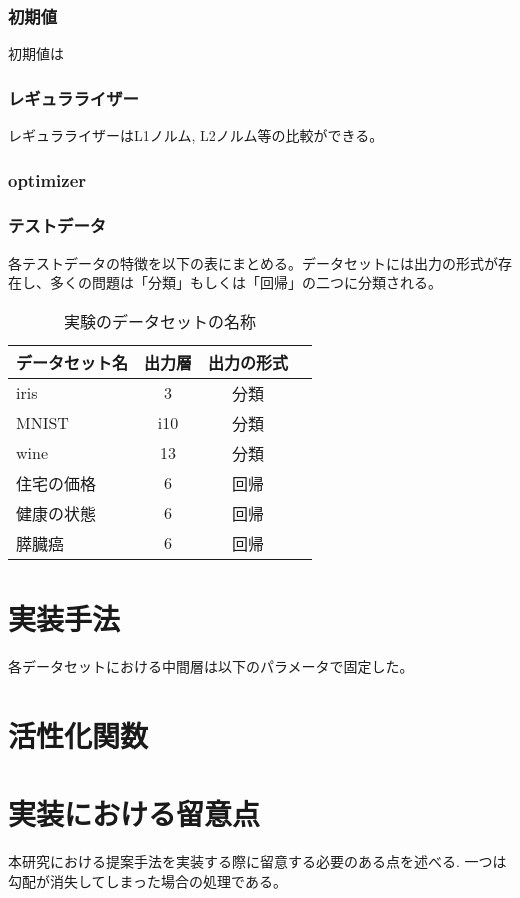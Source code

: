 \subsubsection{初期値}
初期値は
\subsubsection{レギュラライザー}
レギュラライザーはL1ノルム, L2ノルム等の比較ができる。
\subsubsection{optimizer}
\subsubsection{テストデータ}
各テストデータの特徴を以下の表にまとめる。データセットには出力の形式が存在し、多くの問題は「分類」もしくは「回帰」の二つに分類される。


\begin{table}[htbp]
    \begin{center}
        \caption{実験のデータセットの名称}
        \begin{tabular}{l*{2}{c}r}
        データセット名      & 出力層 & 出力の形式 \\
        \hline
        iris            & 3  & 分類 \\
        MNIST               & i10 & 分類  \\
        wine        & 13 & 分類 \\
        住宅の価格           & 6 & 回帰 \\
        健康の状態           & 6 & 回帰 \\
        膵臓癌           & 6 & 回帰 \\
        \end{tabular}
    \end{center}
\end{table}



\section{実装手法}

各データセットにおける中間層は以下のパラメータで固定した。


\section{活性化関数}



\section{実装における留意点}
本研究における提案手法を実装する際に留意する必要のある点を述べる.
一つは勾配が消失してしまった場合の処理である。

\section{}

